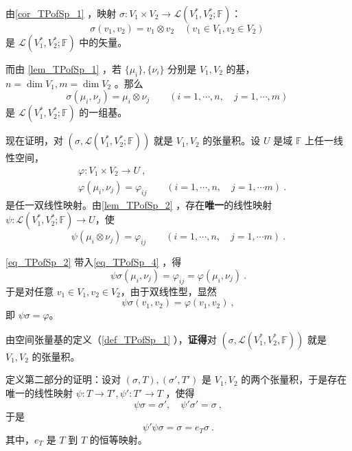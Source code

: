 由\autoref{cor_TPofSp_1} ，映射 $\sigma:V_1\times V_2\rightarrow\mathcal L(V_1^*,V_2^*;\mathbb F) $：
\begin{equation}\label{eq_TPofSp_7}
\sigma(v_1,v_2)=v_1\otimes v_2 \quad (v_1\in V_1,v_2\in V_2 )~
\end{equation}
是  $\mathcal L(V_1^*,V_2^*;\mathbb F)$ 中的矢量。

而由 \autoref{lem_TPofSp_1} ，若 $\{\mu_i\},\{\nu_i\}$ 分别是 $V_1,V_2$ 的基，$n=\dim V_1,m=\dim V_2$ 。那么
\begin{equation}\label{eq_TPofSp_2}
\sigma(\mu_i,\nu_j)=\mu_i\otimes \nu_j\qquad (i=1,\cdots,n,\quad j=1,\cdots,m)~
\end{equation}
是 $\mathcal L(V_1^*,V_2^*;\mathbb F)$ 的一组基。

现在证明，对 $(\sigma,\mathcal L(V_1^*,V_2^*;\mathbb F))$ 就是 $V_1,V_2$ 的张量积。设 $U$ 是域 $\mathbb F$ 上任一线性空间，
\begin{equation}\label{eq_TPofSp_3}
\begin{aligned}
&\varphi:V_1\times V_2\rightarrow U~,\\
&\varphi(\mu_i,\nu_j)=\varphi_{ij}\qquad (i=1,\cdots,n,\quad j=1,\cdots m)~.
\end{aligned}
\end{equation}
是任一双线性映射。由\autoref{lem_TPofSp_2} ，存在\textbf{唯一}的线性映射 $\psi:\mathcal L(V_1^*,V_2^*;\mathbb F)\rightarrow U$，使
\begin{equation}\label{eq_TPofSp_4}
\psi(\mu_i\otimes \nu_j)=\varphi_{ij}\qquad( i=1,\cdots,n,\quad j=1,\cdots m)~.
\end{equation}

\autoref{eq_TPofSp_2} 带入\autoref{eq_TPofSp_4}  ，得
\begin{equation}
\psi\sigma(\mu_i,\nu_j)=\varphi_{ij}=\varphi(\mu_i,\nu_j)~.
\end{equation}
于是对任意 $v_1\in V_1,v_2\in V_2$，由于双线性型，显然
\begin{equation}
\psi\sigma(v_1,v_2)=\varphi(v_1,v_2)~,
\end{equation}
即 $\psi\sigma=\varphi$。

由空间张量基的定义（\autoref{def_TPofSp_1} ），\textbf{证得}对 $(\sigma,\mathcal L(V_1^*,V_2^*,\mathbb F))$ 就是 $V_1,V_2$ 的张量积。

定义第二部分的证明：设对 $(\sigma,T),(\sigma', T')$ 是 $V_1,V_2$ 的两个张量积，于是存在唯一的线性映射 $\psi:T\rightarrow T',\psi':T'\rightarrow T$ ，使得
\begin{equation}
\psi\sigma=\sigma',\quad\psi'\sigma'=\sigma~,
\end{equation}
于是
\begin{equation}
\psi'\psi\sigma=\sigma=e_T\sigma~.
\end{equation}
其中，$e_T$ 是 $T$ 到 $T$ 的恒等映射。

